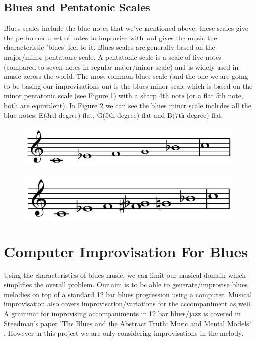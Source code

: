 \documentclass[pdftex,12pt,a4paper]{report}
\begin{document}
\subsection{Blues and Pentatonic Scales}
Blues scales include the blue notes that we've mentioned above, these scales give the performer a set of notes to improvise with and gives the music the characteristic 'blues' feel to it. Blues scales are generally based on the major/minor pentatonic scale. A pentatonic scale is a scale of five notes (compared to seven notes in regular major/minor scale) and is widely used in music across the world. The most common blues scale (and the one we are going to be basing our improvisations on) is the blues minor scale which is based on the minor pentatonic scale (see Figure \ref{fig:cminorpentatonicscale}) with a sharp 4th note (or a flat 5th note, both are equivalent). In Figure \ref{fig:cminorbluesscale} we can see the blues minor scale includes all the blue notes; E(3rd degree) flat, G(5th degree) flat and B(7th degree) flat.


\begin{figure}[here]
  \centering
  \includegraphics[scale=0.3]{figure/minorpentatonicscale.png}
  \label{fig:cminorpentatonicscale}
\end{figure}

\begin{figure}[here]
  \centering
  \includegraphics[scale=0.3]{figure/bluesminorhexatonicscale.png}
  \label{fig:cminorbluesscale}
\end{figure}


\section{Computer Improvisation For Blues}
Using the characteristics of blues music, we can limit our musical domain which simplifies the overall problem. Our aim is to be able to generate/improvise blues melodies on top of a standard 12 bar blues progression using a computer. Musical improvisation also covers improvisation/variations for the accompaniment as well. A grammar for improvising accompaniments in 12 bar blues/jazz is covered in Steedman's paper 'The Blues and the Abstract Truth: Music and Mental Models' \cite{steedman96}. However in this project we are only considering improvisations in the melody.
\end{document}
